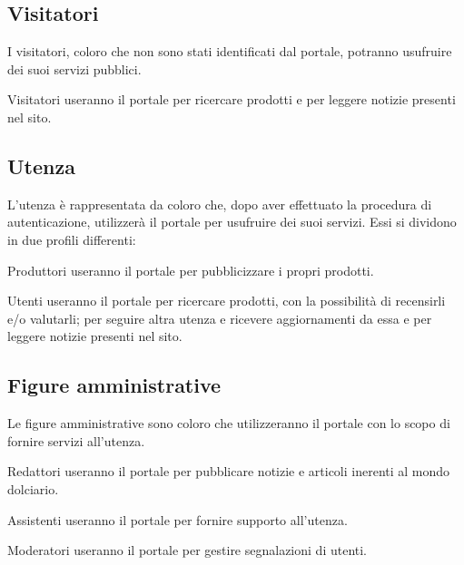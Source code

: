 \subsection{Visitatori} %
\label{sub:}
I visitatori, coloro che non sono stati identificati dal portale, potranno usufruire dei suoi servizi pubblici.
\begin{descriptionInd}
    \item[Visitatori] useranno il portale per ricercare prodotti e per leggere notizie presenti nel sito.
\end{descriptionInd}

\subsection{Utenza}
\label{sub:utenza}
L'utenza è rappresentata da coloro che, dopo aver effettuato la procedura di autenticazione, utilizzerà il portale per usufruire dei suoi servizi. Essi si dividono in due profili differenti:
\begin{descriptionInd}
    \item[Produttori] useranno il portale per pubblicizzare i propri prodotti.

    \item[Utenti] useranno il portale per ricercare prodotti, con la possibilità di recensirli e/o valutarli; per seguire altra utenza e ricevere aggiornamenti da essa e per leggere notizie presenti nel sito.
\end{descriptionInd}


\subsection{Figure amministrative}
\label{sub:figureamministrative}
Le figure amministrative sono coloro che utilizzeranno il portale con lo scopo di fornire servizi all'utenza.
\begin{descriptionInd}
    \item[Redattori] useranno il portale per pubblicare notizie e articoli inerenti al mondo dolciario.   
    \item[Assistenti] useranno il portale per fornire supporto all'utenza.
    \item[Moderatori] useranno il portale per gestire segnalazioni di utenti.
\end{descriptionInd}



